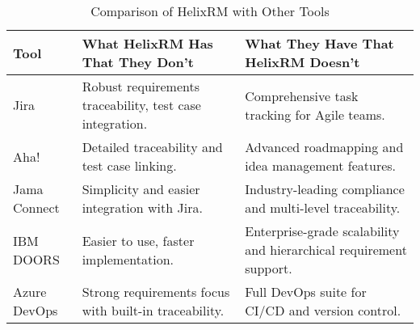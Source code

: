 \begin{table}[H]
    \centering
    \begin{tabular}{p{1cm}p{3.1cm}p{3.1cm}}
        \toprule
        \textbf{Tool} & \textbf{What HelixRM Has That They Don’t}                & \textbf{What They Have That HelixRM Doesn’t}                       \\
        \midrule
        Jira          & Robust requirements traceability, test case integration.
        & Comprehensive task tracking for Agile teams.                       \\
        Aha!
                 & Detailed traceability and test case linking.
                             & Advanced roadmapping and idea management features.                 \\
        Jama Connect  & Simplicity and easier integration with Jira.
                    & Industry-leading compliance and multi-level traceability.          \\
        IBM DOORS     & Easier to use, faster implementation.
                           & Enterprise-grade scalability and hierarchical requirement support. \\
        Azure DevOps  & Strong requirements focus with built-in traceability.
           & Full DevOps suite for CI/CD and version control.                   \\
        \bottomrule
    \end{tabular}
    \linebreak
    \caption{Comparison of HelixRM with Other Tools}
    \label{tab:helix-vs-all}
\end{table}

